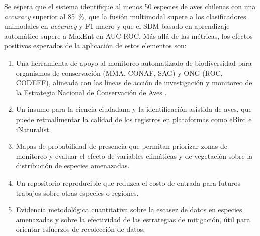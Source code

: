 Se espera que el sistema identifique al menos 50 especies de aves chilenas
con una \textit{accuracy} superior al \SI{85}{\percent}, que la fusión
multimodal supere a los clasificadores unimodales en \textit{accuracy} y F1
macro y que el SDM basado en aprendizaje automático supere a MaxEnt en
AUC-ROC. Más allá de las métricas, los efectos positivos esperados de la
aplicación de estos elementos son:

\begin{enumerate}[label=(\roman*), leftmargin=*, itemsep=2pt]
  \item Una herramienta de apoyo al monitoreo automatizado de biodiversidad
        para organismos de conservación (MMA, CONAF, SAG) y ONG (ROC,
        CODEFF), alineada con las líneas de acción de investigación y
        monitoreo de la Estrategia Nacional de Conservación de Aves
        \citep{mma2022enca}.
  \item Un insumo para la ciencia ciudadana y la identificación asistida de
        aves, que puede retroalimentar la calidad de los registros en
        plataformas como eBird e iNaturalist.
  \item Mapas de probabilidad de presencia que permitan priorizar zonas de
        monitoreo y evaluar el efecto de variables climáticas y de vegetación
        sobre la distribución de especies amenazadas.
  \item Un repositorio reproducible que reduzca el costo de entrada para
        futuros trabajos sobre otras especies o regiones.
  \item Evidencia metodológica cuantitativa sobre la escasez de datos en
        especies amenazadas y sobre la efectividad de las estrategias de
        mitigación, útil para orientar esfuerzos de recolección de datos.
\end{enumerate}
